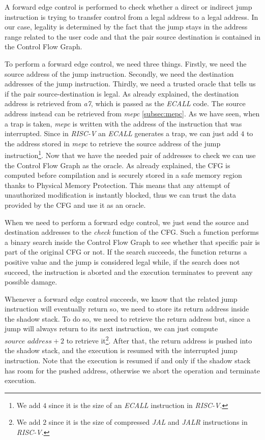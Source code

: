 A forward edge control is performed to check whether a direct or indirect jump
instruction is trying to transfer control from a legal address to a legal
address. In our case, legality is determined by the fact that the jump stays in
the address range related to the user code and that the pair source destination
is contained in the Control Flow Graph.

To perform a forward edge control, we need three things. Firstly, we need the source
address of the jump instruction. Secondly, we need the destination addresses of the
jump instruction. Thirdly, we need a trusted oracle that tells us if the pair source-destination
is legal. As already explained, the destination address is retrieved from \textit{a7},
which is passed as the \textit{ECALL} code. The source address instead can be retrieved
from \textit{mepc} \ref{subsec:mepc}. As we have seen, when a trap is taken, \textit{mepc}
is written with the address of the instruction that was interrupted. Since in \textit{RISC-V}
an \textit{ECALL} generates a trap, we can just add $4$ to the address stored in
\textit{mepc} to retrieve the source address of the jump instruction\footnote{We
add $4$ since it is the size of an \textit{ECALL} instruction in \textit{RISC-V}.}.
Now that we have the needed pair of addresses to check we can use the Control Flow
Graph as the oracle. As already explained, the CFG is computed before compilation
and is securely stored in a safe memory region thanks to Physical Memory Protection.
This means that any attempt of unauthorized modification is instantly blocked, thus
we can trust the data provided by the CFG and use it as an oracle.

When we need to perform a forward edge control, we just send the source and
destination addresses to the \textit{check} function of the CFG. Such a function
performs a binary search inside the Control Flow Graph to see whether that
specific pair is part of the original CFG or not. If the search succeeds, the
function returns a positive value and the jump is considered legal while, if the
search does not succeed, the instruction is aborted and the execution terminates
to prevent any possible damage.

Whenever a forward edge control succeeds, we know that the related jump instruction
will eventually return so, we need to store its return address inside the shadow
stack. To do so, we need to retrieve the return address but, since a jump will always
return to its next instruction, we can just compute $\textit{source address}+ 2$
to retrieve it\footnote{We add $2$ since it is the size of compressed \textit{JAL}
and \textit{JALR} instructions in \textit{RISC-V}.}. After that, the return address
is pushed into the shadow stack, and the execution is resumed with the
interrupted jump instruction. Note that the execution is resumed if and only if the
shadow stack has room for the pushed address, otherwise we abort the operation
and terminate execution.

